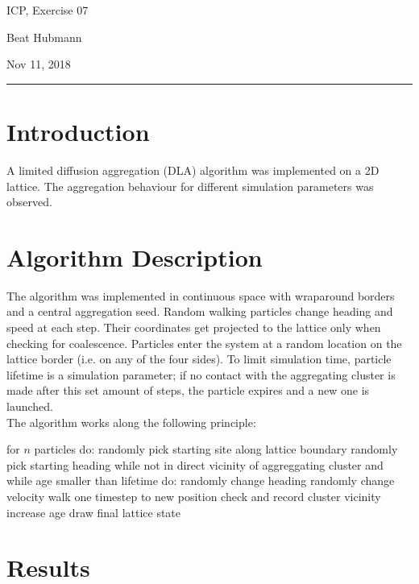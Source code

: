 \documentclass[11pt,a4paper]{article}
\begin{document}
\noindent\parbox{\linewidth}{
 \parbox{.25\linewidth}{ \large ICP, Exercise 07 }\hfill
 \parbox{.5\linewidth}{\begin{center} \large Beat Hubmann \end{center}}\hfill
 \parbox{.2\linewidth}{\begin{flushright} \large Nov 11, 2018 \end{flushright}}
}
\noindent\rule{\linewidth}{2pt}




\section{Introduction}

A limited diffusion aggregation (DLA) algorithm was implemented on a 2D lattice.
The aggregation behaviour for different simulation parameters was observed.

\section{Algorithm Description}
The algorithm was implemented in continuous space with wraparound borders and a central aggregation seed.
Random walking particles change heading and speed at each step. Their coordinates get projected to the lattice only
when checking for coalescence. Particles enter the system at a random location on the lattice border (i.e. on any of the 
four sides). To limit simulation time, particle lifetime is a simulation parameter; if no contact with the aggregating cluster
is made after this set amount of steps, the particle expires and a new one is launched.\\
The algorithm works along the following principle:
\begin{outline}
    \1 for $n$ particles do:
     \2 randomly pick starting site along lattice boundary
     \2 randomly pick starting heading
     \2 while not in direct vicinity of aggreggating cluster and while age smaller than lifetime do:
        \3 randomly change heading
        \3 randomly change velocity
        \3 walk one timestep to new position
        \3 check and record cluster vicinity
        \3 increase age
    \1 draw final lattice state 

\end{outline}

\section{Results}
\end{document}
